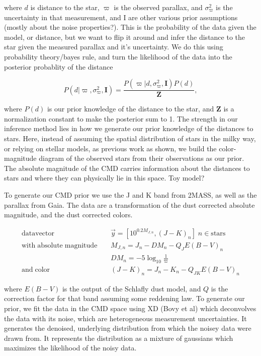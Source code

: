\documentclass[modern]{aastex61}
\begin{document}
where $d$ is distance to the star, $\varpi$ is the observed parallax, and $\sigma^2_{\varpi}$ is the uncertainty in that measurement, and I are other various prior assumptions (mostly about the noise properties?). This is the probability of the data given the model, or distance, but we want to flip it around and infer the distance to the star given the measured parallax and it's uncertainty. We do this using probability theory/bayes rule, and turn the likelihood of the data into the posterior probablity of the distance

\begin{equation}
\label{eq:bayes}
P(d|\varpi, \sigma^2_{\varpi}, \textbf{I}) = \frac{P(\varpi |d, \sigma^2_{\varpi}, \textbf{I}) P(d)}{\textbf{Z}},
\end{equation}

where $P(d)$ is our prior knowledge of the distance to the star, and $\textbf{Z}$ is a normalization constant to make the posterior sum to 1. The strength in our inference method lies in how we generate our prior knowledge of the distances to stars. Here, instead of assuming the spatial distribution of stars in the milky way, or relying on stellar models, as previous work as shown, we build the color-magnitude diagram of the observed stars from their observations as our prior. The absolute magnitude of the CMD carries information about the distances to stars and where they can physically lie in this space. Toy model?

To generate our CMD prior we use the J and K band from 2MASS, as well as the parallax from Gaia. The data are a transformation of the dust corrected absolute magnitude, and the dust corrected colors.

\begin{equation}
\label{eq:data}
\begin{aligned}
\mathrm{data vector} \;\;\;\; &\vec{y} = [10^{0.2M_{J,n}}, (J- K)_n] \;  n \in \mathrm{stars} \\
\mathrm{with \; absolute \; magnitude} \;\;\;\; &M_{J,n} = J_n - DM_n - Q_JE(B-V)_n \\
& DM_n = -5\log_{10}\frac{1}{\varpi} \\
\mathrm{and \; color} \;\;\;\; &(J - K)_n = J_n - K_n - Q_{JK}E(B-V)_n
\end{aligned}
\end{equation}

where $E(B-V)$ is the output of the Schlafly dust model, and $Q$ is the correction factor for that band assuming some reddening law. To generate our prior, we fit the data in the CMD space using XD (Bovy et al) which deconvolves the data with its noise, which are heterogeneous measurement uncertainties. It generates the denoised, underlying distribution from which the noisey data were drawn from. It represents the distribution as a mixture of gaussians which maximizes the likelihood of the noisy data.
\end{document}
